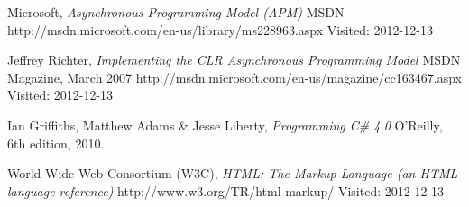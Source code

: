 \begin{thebibliography}{99}

		Microsoft,
		\emph{Asynchronous Programming Model (APM)}\newline
		MSDN\newline
		http://msdn.microsoft.com/en-us/library/ms228963.aspx\newline
		Visited: 2012-12-13
	
		Jeffrey Richter,
		\emph{Implementing the CLR Asynchronous Programming Model}\newline
		MSDN Magazine,
		March 2007\newline
		http://msdn.microsoft.com/en-us/magazine/cc163467.aspx\newline
		Visited: 2012-12-13

		Ian Griffiths, Matthew Adams \& Jesse Liberty,
		\emph{Programming C\# 4.0}\newline
		O'Reilly, 6th edition, 2010.

		World Wide Web Consortium (W3C),
		\emph{HTML: The Markup Language (an HTML language reference)}\newline
		http://www.w3.org/TR/html-markup/\newline
		Visited: 2012-12-13
\end{thebibliography}